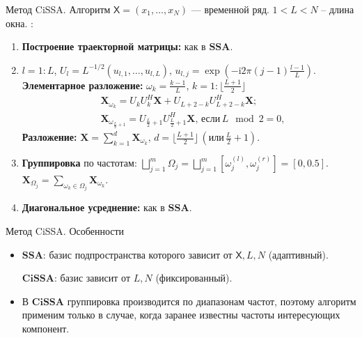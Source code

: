 \documentclass[notheorems, handout]{beamer}
\newcommand{\SSA}{\textbf{SSA}}
\newcommand{\CISSA}{\textbf{CiSSA}}
\newcommand{\TS}{\mathsf{X}}
\begin{document}
	\begin{frame}{Метод CiSSA. Алгоритм}
		\( \TS = (x_1, \ldots, x_N) \) — временной ряд.  \( 1 < L < N \) --  длина окна.
		\textbf{\structure{Алгоритм $\CISSA$}}:
		\begin{enumerate}
			\item \textbf{Построение траекторной матрицы:} как в $\SSA$.
			
			\item $l = 1:L$, ${U}_{l}=L^{-1/2}(u_{l,1},\dots,u_{l,L}), \, u_{l,j}=\exp\left(-\mathrm{i}2\pi(j-1)\frac{l-1}{L}\right).$
			\textbf{Элементарное разложение:} $\omega_k = \frac{k-1}{L}$, $k = 1:\lfloor \frac{L+1}{2} \rfloor$
			\begin{align*}
				&\mathbf X_{\omega_k}  = U_k U_k^H \mathbf X + U_{L+2-k} U_{L+2-k}^H \mathbf X;\\
				&\mathbf X_{\omega_{\frac{L}{2} + 1}}  = 
				U_{\frac{L}{2} + 1} U_{\frac{L}{2} + 1}^H \mathbf X, \, \text{если} \, L \mod 2 = 0,
			\end{align*}
			\textbf{Разложение:}
			$
			\mathbf{X} = \sum\limits_{k=1}^d \mathbf{X}_{\omega_k}, \, d = \lfloor \frac{L+1}{2} \rfloor \, (\text{или} \, \frac{L}{2} + 1).
			$

			\item \textbf{Группировка} по частотам:
			$\bigsqcup \limits_{j=1}^m \Omega_j = 
			\bigsqcup \limits_{j=1}^m 
			\left[ \omega_j^{(l)}, \omega_j^{(r)} \right] =
			[0, 0.5]$. $\mathbf X_{\Omega_j} =\sum\limits_{\omega_k \in \Omega_j} \mathbf{X}_{\omega_k}$.

			\item \textbf{Диагональное усреднение:} как в $\SSA$.
		\end{enumerate}

	\end{frame}

	\begin{frame}{Метод CiSSA. Особенности}
		\bigskip
		\begin{itemize}
			\item $\SSA$: базис подпространства которого зависит от $\TS, L, N$ (адаптивный).
			
			$\CISSA$: базис зависит от $L, N$ (фиксированный).
			\bigskip
			\item В $\CISSA$ группировка производится по диапазонам частот, поэтому алгоритм применим только в случае, когда заранее известны частоты интересующих компонент.
		\end{itemize}
	\end{frame}
	
\end{document}
